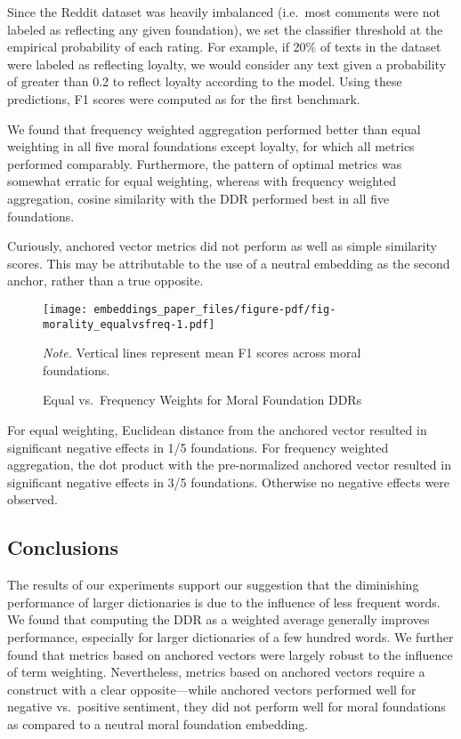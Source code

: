 \documentclass[
  man,
  floatsintext,
  longtable,
  nolmodern,
  notxfonts,
  notimes,
  colorlinks=true,linkcolor=blue,citecolor=blue,urlcolor=blue]{apa7}
\begin{document}
Since the Reddit dataset was heavily imbalanced (i.e.~most comments were
not labeled as reflecting any given foundation), we set the classifier
threshold at the empirical probability of each rating. For example, if
20\% of texts in the dataset were labeled as reflecting loyalty, we
would consider any text given a probability of greater than 0.2 to
reflect loyalty according to the model. Using these predictions, F1
scores were computed as for the first benchmark.

We found that frequency weighted aggregation performed better than equal
weighting in all five moral foundations except loyalty, for which all
metrics performed comparably. Furthermore, the pattern of optimal
metrics was somewhat erratic for equal weighting, whereas with frequency
weighted aggregation, cosine similarity with the DDR performed best in
all five foundations.

Curiously, anchored vector metrics did not perform as well as simple
similarity scores. This may be attributable to the use of a neutral
embedding as the second anchor, rather than a true opposite.

\begin{figure}

{\caption{{Equal vs.~Frequency Weights for Moral Foundation
DDRs}{\label{fig-morality\_equalvsfreq}}}}

\texttt{[image: embeddings\_paper\_files/figure-pdf/fig-morality\_equalvsfreq-1.pdf]}

{\noindent \emph{Note.} Vertical lines represent mean F1 scores across
moral foundations.}

\end{figure}

For equal weighting, Euclidean distance from the anchored vector
resulted in significant negative effects in 1/5 foundations. For
frequency weighted aggregation, the dot product with the pre-normalized
anchored vector resulted in significant negative effects in 3/5
foundations. Otherwise no negative effects were observed.

\subsection{Conclusions}\label{conclusions}

The results of our experiments support our suggestion that the
diminishing performance of larger dictionaries is due to the influence
of less frequent words. We found that computing the DDR as a weighted
average generally improves performance, especially for larger
dictionaries of a few hundred words. We further found that metrics based
on anchored vectors were largely robust to the influence of term
weighting. Nevertheless, metrics based on anchored vectors require a
construct with a clear opposite---while anchored vectors performed well
for negative vs.~positive sentiment, they did not perform well for moral
foundations as compared to a neutral moral foundation embedding.
\end{document}
